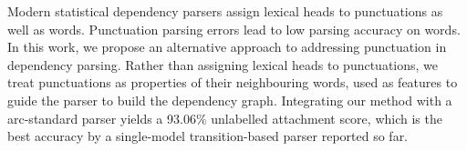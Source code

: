 Modern statistical dependency parsers assign lexical heads to punctuations as well as words. Punctuation parsing errors lead to low parsing accuracy on words. In this work, we propose an alternative approach to addressing punctuation in dependency parsing. Rather than assigning lexical heads to punctuations, we treat punctuations as properties of their neighbouring words, used as features to guide the parser to build the dependency graph. Integrating our method with a arc-standard parser yields a 93.06\% unlabelled attachment score, which is the best accuracy by a single-model transition-based parser reported so far.
